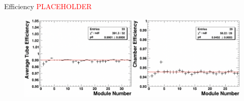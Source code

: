 \documentclass{beamer}
\def\ph{\textcolor{red}{PLACEHOLDER}}
\begin{document}
		\begin{frame}{Efficiency \ph}
			\begin{figure}[t]
				\centering	
				\includegraphics[width=0.8\pdfpagewidth]{ChamberEfficiency.png}
				\label{fig:ChamberEfficiency}
			\end{figure}
		\end{frame}
		
\end{document}
